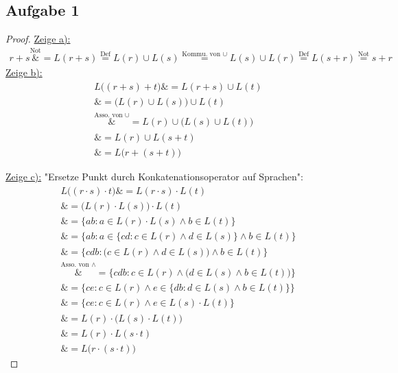 \subsection{Aufgabe 1}

\begin{proof}
	\underline{Zeige a):}
	\begin{align*}
		r+s
		\overset{\text{Not}}&=		
		L(r+s)
		\overset{\text{Def}}=
		L(r)\cup L(s)
		\overset{\text{Kommu. von }\cup}=
		L(s)\cup L(r)
		\overset{\text{Def}}=
		L(s+r)
		\overset{\text{Not}}=	
		s+r
	\end{align*}
	\underline{Zeige b):}
	\begin{align*}
		L\big((r+s)+t\big)
		\overset{\text{}}&=
		L(r+s)\cup L(t)\\
		\overset{\text{}}&=
		\big(L(r)\cup L(s)\big)\cup L(t)\\
		\overset{\text{Asso. von }\cup}&=
		L(r)\cup\big(L(s)\cup L(t)\big)\\
		\overset{\text{}}&=
		L(r)\cup L(s+t)\\
		\overset{\text{}}&=
		L\big(r+(s+t)\big)
	\end{align*}
	
	\underline{Zeige c):} "Ersetze Punkt durch Konkatenationsoperator auf Sprachen":
	\begin{align*}
		L\big((r\cdot s)\cdot t\big)
		\overset{\text{}}&=
		L(r\cdot s)\cdot L(t)\\
		\overset{\text{}}&=
		\big(L(r)\cdot L(s)\big)\cdot L(t)\\
		\overset{\text{}}&=
		\big\lbrace ab:a\in L(r)\cdot L(s)\wedge b\in L(t)\big\rbrace\\
		\overset{\text{}}&=
		\Big\lbrace ab:a\in\big\lbrace cd:c\in L(r)\wedge d\in L(s)\big\rbrace\wedge b\in L(t)\Big\rbrace\\
		\overset{\text{}}&=
		\Big\lbrace cdb:\big(c\in L(r)\wedge d\in L(s)\big)\wedge b\in L(t)\Big\rbrace\\
		\overset{\text{Asso. von }\wedge}&=
		\Big\lbrace cdb:c\in L(r)\wedge\big(d\in L(s)\wedge b\in L(t)\big)\Big\rbrace\\
		\overset{\text{}}&=
		\Big\lbrace ce:c\in L(r)\wedge e\in\big\lbrace db:d\in L(s)\wedge b\in L(t)\big\rbrace\Big\rbrace\\
		\overset{\text{}}&=
		\big\lbrace ce:c\in L(r)\wedge e\in L(s)\cdot L(t)\big\rbrace\\
		\overset{\text{}}&=
		L(r)\cdot\big(L(s)\cdot L(t)\big)\\
		\overset{\text{}}&=
		L(r)\cdot L(s\cdot t)\\
		\overset{\text{}}&=
		L\big(r\cdot(s\cdot t)\big)
	\end{align*}
	

\end{proof}
